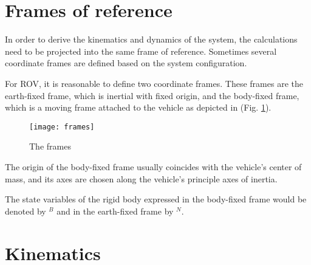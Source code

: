 \section{Frames of reference}

    In order to derive the kinematics and dynamics of the system, the calculations need to be projected into 
    the same frame of reference. 
    Sometimes several coordinate frames are defined based on the system configuration. 
    
    For ROV, it is reasonable to define two coordinate frames. 
    These frames are the earth-fixed frame, which is inertial with fixed origin, and the body-fixed frame, 
    which is a moving frame attached to the vehicle as depicted in (Fig. \ref{image:frames}). 
    \begin{figure}[H]
        \centering\texttt{[image: frames]}
        \caption{The frames}
        \label{image:frames}
    \end{figure}

    The origin of the body-fixed frame usually coincides with the vehicle's center of mass,
     and its axes are chosen along the vehicle's principle axes of inertia.

    The state variables of the rigid body expressed in the body-fixed frame would be 
    denoted by $^B$ and in the earth-fixed frame by $^N$.

\section{Kinematics}

